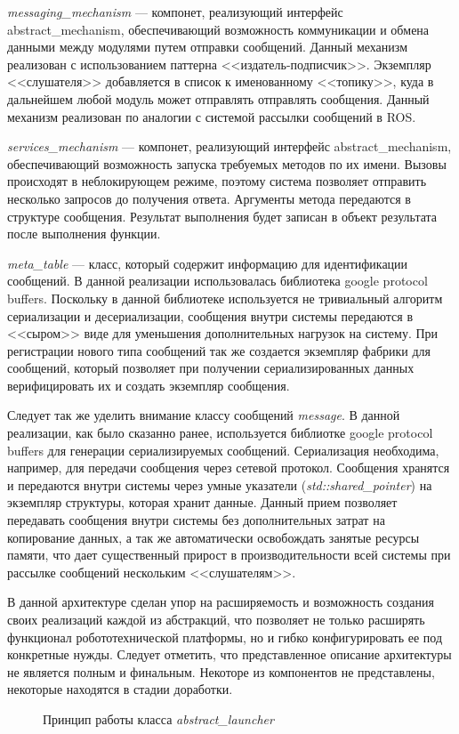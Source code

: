 \textit{messaging\_mechanism} --- компонет, реализующий интерфейс abstract\_mechanism, обеспечивающий возможность коммуникации и обмена данными между модулями путем отправки сообщений. Данный механизм реализован с использованием паттерна <<издатель-подписчик>>. Экземпляр <<слушателя>> добавляется в список к именованному <<топику>>, куда в дальнейшем любой модуль может отправлять отправлять сообщения. Данный механизм реализован по аналогии с системой рассылки сообщений в ROS.

\textit{services\_mechanism} --- компонет, реализующий интерфейс abstract\_mechanism, обеспечивающий возможность запуска требуемых методов по их имени. Вызовы происходят в неблокирующем режиме, поэтому система позволяет отправить несколько запросов до получения ответа. Аргументы метода передаются в структуре сообщения. Результат выполнения будет записан в объект результата после выполнения функции. 

\textit{meta\_table} --- класс, который содержит информацию для идентификации сообщений. В данной реализации использовалась библиотека google protocol buffers. Поскольку в данной библиотеке используется не тривиальный алгоритм сериализации и десериализации, сообщения внутри системы передаются в <<сыром>> виде для уменьшения дополнительных нагрузок на систему. При регистрации нового типа сообщений так же создается экземпляр фабрики для сообщений, который позволяет при получении сериализированных данных верифицировать их и создать экземпляр сообщения.

Следует так же уделить внимание классу сообщений \textit{message}. В данной реализации, как было сказанно ранее, используется библиотке google protocol buffers для генерации сериализируемых сообщений. Сериализация необходима, например, для передачи сообщения через сетевой протокол. Сообщения хранятся и передаются внутри системы через умные указатели (\textit{std::shared\_pointer}) на экземпляр структуры, которая хранит данные. Данный прием позволяет передавать сообщения внутри системы без дополнительных затрат на копирование данных, а так же автоматически освобождать занятые ресурсы памяти, что дает существенный прирост в производительности всей системы при рассылке сообщений нескольким <<слушателям>>.

В данной архитектуре сделан упор на расширяемость и возможность создания своих реализаций каждой из абстракций, что позволяет не только расширять функционал робототехнической платформы, но и гибко конфигурировать ее под конкретные нужды. Следует отметить, что представленное описание архитектуры не является полным и финальным. Некоторе из компонентов не представлены, некоторые находятся в стадии доработки. 

\begin{figure}[h]
    \caption{Принцип работы класса \textit{abstract\_launcher}}
    \label{im:2_2_2_sequence_diag}
\end{figure}


